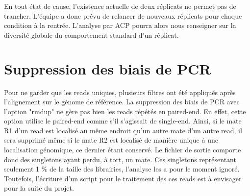 \documentclass[a4paper,12pt,times]{report}
\begin{document}
  \bigskip
  En tout état de cause, l'existence actuelle de deux réplicats ne permet pas de trancher.
L'équipe a donc prévu de relancer de nouveaux réplicats pour chaque condition à la rentrée. L'analyse par ACP pourra alors nous renseigner sur la diversité globale du comportement standard d'un réplicat.

 
 \section{Suppression des biais de PCR}
 Pour ne garder que les reads uniques, plusieurs filtres ont été appliqués après l'alignement sur le génome de référence. La suppression des biais de PCR avec l'option "rmdup" ne gère pas bien les reads répétés en paired-end.  En effet, cette option utilise le paired-end comme s'il s'agissait de single-end. 
 Ainsi, si le mate R1 d'un read est localisé au même endroit qu'un autre mate d'un autre read, il sera supprimé même si le mate R2 est localisé de manière unique à une localisation génomique, ce dernier étant conservé. Le fichier de sortie comporte donc des singletons ayant perdu, à tort, un mate. Ces singletons représentant seulement 1 \% de la taille des  librairies, l'analyse les a pour le moment ignoré. Toutefois, l'écriture d'un script pour le traitement des ces reads est à envisager pour la suite du projet.
  
\end{document}
